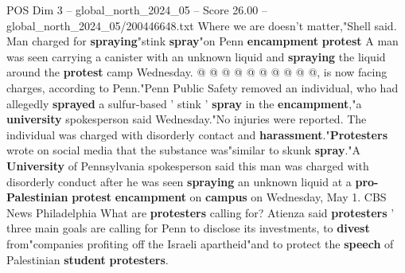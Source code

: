 \begin{textsample}{POS Dim 3 – global\_north\_2024\_05 – Score 26.00 – global\_north\_2024\_05/200446648.txt}
Where we are doesn't matter,"Shell said.
Man charged for \textbf{spraying}"stink \textbf{spray}"on Penn \textbf{encampment} \textbf{protest} A man was seen carrying a canister with an unknown liquid and \textbf{spraying} the liquid around the \textbf{protest} camp Wednesday. @ @ @ @ @ @ @ @ @ @, is now facing charges, according to Penn."Penn Public Safety removed an individual, who had allegedly \textbf{sprayed} a sulfur-based ' stink ' \textbf{spray} in the \textbf{encampment},"a \textbf{university} spokesperson said Wednesday."No injuries were reported.
The individual was charged with disorderly contact and \textbf{harassment}."\textbf{Protesters} wrote on social media that the substance was"similar to skunk \textbf{spray}."A \textbf{University} of Pennsylvania spokesperson said this man was charged with disorderly conduct after he was seen \textbf{spraying} an unknown liquid at a \textbf{pro-Palestinian} \textbf{protest} \textbf{encampment} on \textbf{campus} on Wednesday, May 1.
CBS News Philadelphia What are \textbf{protesters} calling for?
Atienza said \textbf{protesters} ' three main goals are calling for Penn to disclose its investments, to \textbf{divest} from"companies profiting off the Israeli apartheid"and to protect the \textbf{speech} of Palestinian \textbf{student} \textbf{protesters}.

\end{textsample}
